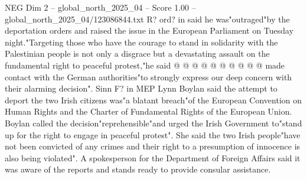 \begin{textsample}{NEG Dim 2 – global\_north\_2025\_04 – Score 1.00 – global\_north\_2025\_04/123086844.txt}
R? ord? in said he was"outraged"by the deportation orders and raised the issue in the European Parliament on Tuesday night."Targeting those who have the courage to stand in solidarity with the Palestinian people is not only a disgrace but a devastating assault on the fundamental right to peaceful protest,"he said @ @ @ @ @ @ @ @ @ @ made contact with the German authorities"to strongly express our deep concern with their alarming decision".
Sinn F? in MEP Lynn Boylan said the attempt to deport the two Irish citizens was"a blatant breach"of the European Convention on Human Rights and the Charter of Fundamental Rights of the European Union.
Boylan called the decision"reprehensible"and urged the Irish Government to"stand up for the right to engage in peaceful protest".
She said the two Irish people"have not been convicted of any crimes and their right to a presumption of innocence is also being violated".
A spokesperson for the Department of Foreign Affairs said it was aware of the reports and stands ready to provide consular assistance.

\end{textsample}

